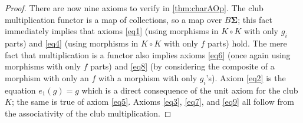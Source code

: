 \documentclass{amsbook} %
\newcommand{\mb}{\mathbf}
\numberwithin{section}{chapter}
\begin{document}
\begin{proof}

There are now nine axioms to verify in \cref{thm:charAOp}.  The club multiplication functor is a map of collections, so a map over $B\mb{\Sigma}$; this fact immediately implies that axioms \eqref{eq1} (using morphisms in $K \circ K$ with only $g_{i}$ parts) and \eqref{eq4} (using morphisms in $K \circ K$ with only $f$ parts) hold.  The mere fact that multiplication is a functor also implies axioms \eqref{eq6} (once again using morphisms with only $f$ parts) and \eqref{eq8} (by considering the composite of a morphism with only an $f$ with a morphism with only $g_{i}$'s).  Axiom \eqref{eq2} is the equation $e_{1}(g) = g$ which is a direct consequence of the unit axiom for the club $K$; the same is true of axiom \eqref{eq5}.  Axioms \eqref{eq3}, \eqref{eq7},  and \eqref{eq9} all follow from the associativity of the club multiplication.




\end{proof}
\end{document}
